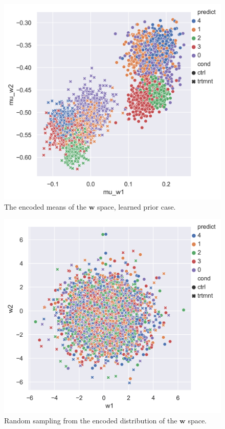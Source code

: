 \documentclass[11pt, a4paper]{report}
\theoremstyle{plain}
\theoremstyle{definition}
\theoremstyle{remark}
\newcommand{\w}{\mathbf{w}}
\begin{document}
\begin{figure}[h]
\centering
\includegraphics[width=1.1\textwidth]{images/blobs_cgmvae_learnedprior_mu_w.png}
\caption{The encoded means of the $\w$ space, learned prior case.
}
\label{fig:blobs_lp_muw}
\end{figure}

\begin{figure}[h]
\centering
\includegraphics[width=1.1\textwidth]{images/blobs_cgmvae_learnedprior_w.png}
\caption{Random sampling from the encoded distribution of the $\w$ space. 
}
\label{fig:blobs_lp_w}
\end{figure}
\end{document}

